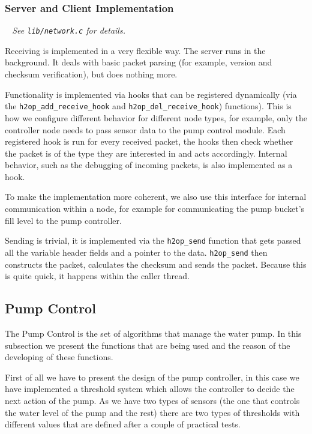 \documentclass[11pt,paper=a4,parskip=half]{scrartcl}
\begin{document}
\subsubsection{Server and Client Implementation}
\textit{\textrightarrow~ See \texttt{lib/network.c} for details.}

Receiving is implemented in a very flexible way. The server runs in the background. It deals with basic packet parsing (for example, version and checksum verification), but does nothing more.

Functionality is implemented via hooks that can be registered dynamically (via
the \texttt{h2op\_\allowbreak add\_\allowbreak receive\_\allowbreak hook} and
\texttt{h2op\_\allowbreak del\_\allowbreak receive\_\allowbreak hook})
functions). This is how we configure different behavior for different node
types, for example, only the controller node needs to pass sensor data to the
pump control module. Each registered hook is run for every received packet, the
hooks then check whether the packet is of the type they are interested in and
acts accordingly. Internal behavior, such as the debugging of incoming packets,
is also implemented as a hook.

To make the implementation more coherent, we also use this interface for
internal communication within a node, for example for communicating the pump
bucket's fill level to the pump controller.


Sending is trivial, it is implemented via the \texttt{h2op\_\allowbreak send}
function that gets passed all the variable header fields and a pointer to the
data. \texttt{h2op\_\allowbreak send} then constructs the packet, calculates
the checksum and sends the packet. Because this is quite quick, it happens
within the caller thread.



\subsection{Pump Control}

The Pump Control is the set of algorithms that manage the water pump.
In this subsection we present the functions that are being used and the reason
of the developing of these functions.

First of all we have to present the design of the pump controller, in this case
we have implemented a threshold system which allows the controller to decide
the next action of the pump. As we have two types of sensors (the one that
controls the water level of the pump and the rest) there are two types of
thresholds with different values that are defined after a couple of practical
tests.
\end{document}
